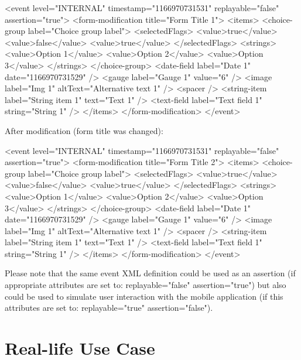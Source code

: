 \begin{xmlblock}
	<event level="INTERNAL" timestamp="1166970731531"
		replayable="false" assertion="true">
		<form-modification title="Form Title 1">
			<items>
				<choice-group label="Choice group label">
					<selectedFlags>
						<value>true</value>
						<value>false</value>
						<value>true</value>
					</selectedFlags>
					<strings>
						<value>Option 1</value>
						<value>Option 2</value>
						<value>Option 3</value>
					</strings>
				</choice-group>
				<date-field label="Date 1" date="1166970731529" />
				<gauge label="Gauge 1" value="6" />
				<image label="Img 1" altText="Alternative text 1" />
				<spacer />
				<string-item label="String item 1" text="Text 1" />
				<text-field label="Text field 1" string="String 1" />
			</items>
		</form-modification>
	</event>
\end{xmlblock}

After modification (form title was changed):

\begin{xmlblock}
	<event level="INTERNAL" timestamp="1166970731531"
		replayable="false" assertion="true">
		<form-modification title="Form Title 2">
			<items>
				<choice-group label="Choice group label">
					<selectedFlags>
						<value>true</value>
						<value>false</value>
						<value>true</value>
					</selectedFlags>
					<strings>
						<value>Option 1</value>
						<value>Option 2</value>
						<value>Option 3</value>
					</strings>
				</choice-group>
				<date-field label="Date 1" date="1166970731529" />
				<gauge label="Gauge 1" value="6" />
				<image label="Img 1" altText="Alternative text 1" />
				<spacer />
				<string-item label="String item 1" text="Text 1" />
				<text-field label="Text field 1" string="String 1" />
			</items>
		</form-modification>
	</event>
\end{xmlblock}

Please note that the same event XML definition could be used as an assertion
(if appropriate attributes are set to: replayable="false" assertion="true") but also
could be used to simulate user interaction with the mobile application
(if this attributes are set to: replayable="true" assertion="false").

\section{Real-life Use Case}

